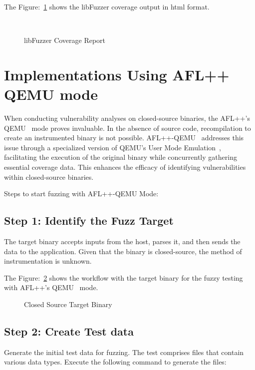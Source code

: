 The Figure:~\ref{fig:llvm_cov_report} shows the libFuzzer coverage output in html format.

\begin{figure}[H]
    \caption{libFuzzer Coverage Report}~\label{fig:llvm_cov_report}
\end{figure}

\section{Implementations Using AFL++ QEMU mode}

When conducting vulnerability analyses on closed-source binaries, the
AFL++'s QEMU~\cite{AFLplusp57:online} mode proves invaluable. In the absence of
source code, recompilation to create an instrumented binary is not possible.
AFL++-QEMU~\cite{AFLplusp57:online} addresses this issue through
a specialized version of QEMU's User Mode Emulation~\cite{bellard2005qemu},
facilitating the execution of the original binary while concurrently gathering essential coverage data.
This enhances the efficacy of identifying vulnerabilities within closed-source
binaries.

Steps to start fuzzing with AFL++-QEMU Mode:

\subsection*{Step 1: Identify the Fuzz Target}

The target binary accepts inputs from the host, parses it, and then sends the
data to the application. Given that the binary is closed-source,
the method of instrumentation is unknown.

The Figure:~\ref{fig:simplified_closed_binaries} shows the workflow with the target binary
for the fuzzy testing with AFL++'s QEMU~\cite{AFLplusp57:online} mode.

\begin{figure}[H]
    \caption{Closed Source Target Binary}\label{fig:simplified_closed_binaries}
\end{figure}

\subsection*{Step 2: Create Test data}
Generate the initial test data for fuzzing. The test comprises files that
contain various data types. Execute the following command to generate the files:

